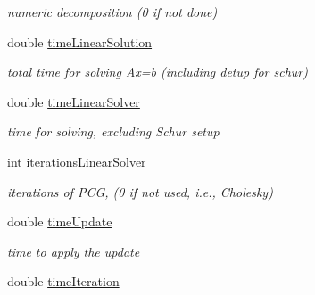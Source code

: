 \begin{DoxyCompactItemize}
\begin{DoxyCompactList}\small\item\em numeric decomposition (0 if not done) \end{DoxyCompactList}\item 
\hypertarget{structg2o_1_1G2OBatchStatistics_a01fea9876aab94b1e69a6a03c20fd98f}{double \hyperlink{structg2o_1_1G2OBatchStatistics_a01fea9876aab94b1e69a6a03c20fd98f}{time\-Linear\-Solution}}\label{structg2o_1_1G2OBatchStatistics_a01fea9876aab94b1e69a6a03c20fd98f}

\begin{DoxyCompactList}\small\item\em total time for solving Ax=b (including detup for schur) \end{DoxyCompactList}\item 
\hypertarget{structg2o_1_1G2OBatchStatistics_adb423c3dac9262b7f4a315bbb108464a}{double \hyperlink{structg2o_1_1G2OBatchStatistics_adb423c3dac9262b7f4a315bbb108464a}{time\-Linear\-Solver}}\label{structg2o_1_1G2OBatchStatistics_adb423c3dac9262b7f4a315bbb108464a}

\begin{DoxyCompactList}\small\item\em time for solving, excluding Schur setup \end{DoxyCompactList}\item 
\hypertarget{structg2o_1_1G2OBatchStatistics_a0ef94423b56f6d842e33a7c277c930a0}{int \hyperlink{structg2o_1_1G2OBatchStatistics_a0ef94423b56f6d842e33a7c277c930a0}{iterations\-Linear\-Solver}}\label{structg2o_1_1G2OBatchStatistics_a0ef94423b56f6d842e33a7c277c930a0}

\begin{DoxyCompactList}\small\item\em iterations of P\-C\-G, (0 if not used, i.\-e., Cholesky) \end{DoxyCompactList}\item 
\hypertarget{structg2o_1_1G2OBatchStatistics_a510e287e5a3e1f608219147b53e6dc69}{double \hyperlink{structg2o_1_1G2OBatchStatistics_a510e287e5a3e1f608219147b53e6dc69}{time\-Update}}\label{structg2o_1_1G2OBatchStatistics_a510e287e5a3e1f608219147b53e6dc69}

\begin{DoxyCompactList}\small\item\em time to apply the update \end{DoxyCompactList}\item 
\hypertarget{structg2o_1_1G2OBatchStatistics_a60fbec94ce0b7f26ed99d3f6d2080e47}{double \hyperlink{structg2o_1_1G2OBatchStatistics_a60fbec94ce0b7f26ed99d3f6d2080e47}{time\-Iteration}}\label{structg2o_1_1G2OBatchStatistics_a60fbec94ce0b7f26ed99d3f6d2080e47}


\end{DoxyCompactItemize}
